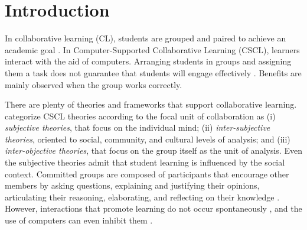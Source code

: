 \documentclass[3p,times,preprint]{elsarticle}
\begin{document}


\section{Introduction}
\label{intro}
In collaborative learning (CL), students are grouped and paired to achieve an academic goal \citep{gokhale1995collaborative}. In Computer-Supported Collaborative Learning (CSCL), learners interact with the aid of computers. Arranging students in groups and assigning them a task does not guarantee that students will engage effectively \citep{soller2001supporting}. Benefits are mainly observed when the group works correctly. 

\textcolor{coolblack}{
There are plenty of theories and frameworks that support 
collaborative learning. \cite{stahl2020theories} categorize CSCL theories according to the focal unit of collaboration as (i) \textit{subjective theories}, that focus on the individual mind; (ii) \textit{inter-subjective theories},  oriented to social, community, and cultural levels of analysis; and (iii) \textit{inter-objective theories}, that focus on the group itself as the unit of analysis. Even the subjective theories admit that student learning is influenced by the social context.}
Committed groups are composed of participants that encourage other members by asking questions, explaining and justifying their opinions, articulating their reasoning, elaborating, and reflecting on their knowledge \citep{soller2001supporting}. However, interactions that promote learning do not occur spontaneously \citep{onrubia2012role, schwarz2011moderation,tchounikine2010computer}, and the use of computers can even inhibit them \citep{orvis2006computer}.
\end{document}
